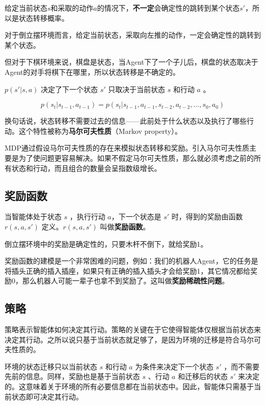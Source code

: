 \documentclass[lang=cn,newtx,10pt,scheme=chinese]{elegantbook}
\begin{document}
给定当前状态$s$和采取的动作$a$的情况下，\textbf{不一定}会确定性的跳转到某个状态$s'$，所以是状态转移概率。

对于倒立摆环境而言，给定当前状态，采取向左推的动作，一定会确定性的跳转到某个状态。

但对于下棋环境来说，棋盘是状态，当Agent下了一个子儿后，棋盘的状态取决于Agent的对手将棋下在哪里，所以状态转移是不确定的。

$p(s'|s,a)$ 决定了下一个状态 $s'$ 只取决于当前状态 $s$ 和行动 $a$ 。

\begin{equation}
p(s_t|s_{t-1},a_{t-1}) = p(s_t|s_{t-1},a_{t-1},s_{t-2},a_{t-2},\dots,s_0,a_0)
\end{equation}

换句话说，状态转移不需要过去的信息——此前处于什么状态以及执行了哪些行动。这个特性被称为\textbf{马尔可夫性质}（Markov property）。

\begin{marker}
MDP通过假设马尔可夫性质的存在来模拟状态转移和奖励。引入马尔可夫性质主要是为了使问题更容易解决。如果不假定马尔可夫性质，那么就必须考虑之前的所有状态和行动，而且组合的数量会呈指数级增长。
\end{marker}

\subsection{奖励函数}

当智能体处于状态 $s$ ，执行行动 $a$，下一个状态是 $s'$ 时，得到的奖励由函数 $r(s,a,s')$ 定义。$r(s,a,s')$ 叫做\textbf{奖励函数}。

\begin{marker}
倒立摆环境中的奖励是确定性的，只要木杆不倒下，就给奖励1。
\end{marker}

奖励函数的建模是一个非常困难的问题，例如：我们的机器人Agent，它的任务是将插头正确的插入插座，如果只有正确的插入插头才会给奖励1，其它情况都给奖励0，那么机器人可能一辈子也拿不到奖励了。这叫做\textbf{奖励稀疏性问题}。

\subsection{策略}

策略表示智能体如何决定其行动。策略的关键在于它使得智能体仅根据当前状态来决定其行动。之所以说只基于当前状态就足够了，是因为环境的迁移是符合马尔可夫性质的。

环境的状态迁移只以当前状态 $s$ 和行动 $a$ 为条件来决定下一个状态 $s'$ ，而不需要先前的信息。同样，奖励也是基于当前状态 $s$ 、行动 $a$ 和迁移后的状态 $s'$ 来决定的。这意味着关于环境的所有必要信息都在当前状态中。因此，智能体只需基于当前状态即可决定其行动。
\end{document}
